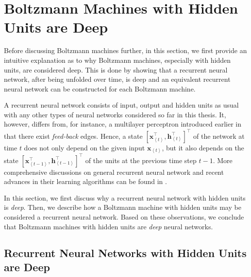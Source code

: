 \documentclass[dissertation,nocontribution,draft*]{aaltoseries}
\newcommand{\qt}[1]{\left<#1\right>}
\newcommand{\vect}[1]{\mathbf{#1}}
\newcommand{\vh}[0]{\vect{h}}
\newcommand{\vx}[0]{\vect{x}}
\begin{document}
\section{Boltzmann Machines with Hidden Units are Deep}

Before discussing Boltzmann machines further, in this
section, we first provide an intuitive explanation as to why
Boltzmann machines, especially with hidden units, are
considered deep. This is done by showing that a recurrent
neural network, after being unfolded over time, is deep and
an equivalent recurrent neural network can be constructed
for each Boltzmann machine.

A recurrent neural network consists of input, output and
hidden units as usual with any other types of neural
networks considered so far in this thesis. It, however,
differs from, for instance, a multilayer perceptron
introduced earlier in that there exist \textit{feed-back}
edges. Hence, a state $\left[ \vx^\top_{\qt{t}},
\vh^\top_{\qt{t}}\right]^\top$ of the network at time $t$ does not
only depend on the given input $\vx_{\qt{t}}$, but it also
depends on
the state $\left[ \vx^\top_{\qt{t-1}}, \vh^\top_{\qt{t-1}}\right]^\top$
of the units at the previous time step $t-1$. More
comprehensive discussions on general recurrent neural network
and recent advances in their learning algorithms can be
found in \citep[][and references
therein]{Bengio2013rec,Sutskever2013,Haykin2009}.

In this section, we first discuss why a recurrent neural
network with hidden units is \textit{deep}. Then, we
describe how a Boltzmann machine with hidden units may be
considered a recurrent neural network. Based on these
observations, we conclude that Boltzmann machines with
hidden units are \textit{deep} neural networks.


\subsection{Recurrent Neural Networks with Hidden Units are
Deep}
\label{sec:rnn_deep}
\end{document}
